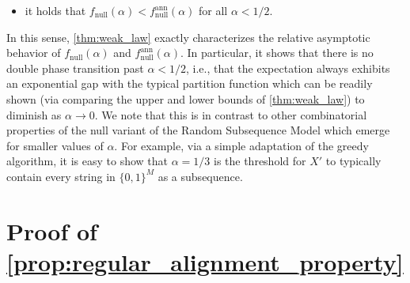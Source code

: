 \documentclass[11pt]{amsart}
\numberwithin{equation}{section}
\numberwithin{equation}{section}
\newcommand{\1}{\mathbbm{1}}
\newcommand{\fnull}{f_{\mathrm{null}}}
\newcommand{\fnullann}{f_{\mathrm{null}}^{\mathrm{ann}}}
\theoremstyle{definition}
\begin{document}
\begin{appendices}
\begin{itemize}
    \item it holds that $\fnull(\alpha) < \fnullann(\alpha)$ for all $\alpha < 1/2$.
\end{itemize}
In this sense, \cref{thm:weak_law} exactly characterizes the relative asymptotic behavior of $\fnull(\alpha)$ and $\fnullann(\alpha)$. In particular, it shows that there is no double phase transition past $\alpha < 1/2$, i.e., that the expectation always exhibits an exponential gap with the typical partition function which can be readily shown (via comparing the upper and lower bounds of \cref{thm:weak_law}) to diminish as $\alpha \to 0$. We note that this is in contrast to other combinatorial properties of the null variant of the Random Subsequence Model which emerge for smaller values of $\alpha$. For example, via a simple adaptation of the greedy algorithm, it is easy to show that $\alpha = 1/3$ is the threshold for $X'$ to typically contain every string in $\{0,1\}^M$ as a subsequence.

\section{\texorpdfstring{Proof of \cref{prop:regular_alignment_property}}{Proof of Proposition \ref{prop:regular_alignment_property}}} \label{app:RAP_proof}


\end{appendices}
\end{document}
